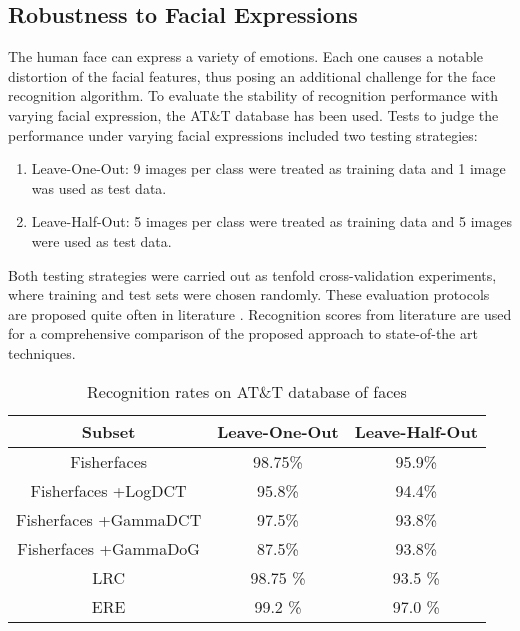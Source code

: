 \subsection{Robustness to Facial Expressions}
The human face can express a variety of emotions. %
Each one causes a notable distortion of the facial features, thus posing an additional
 challenge for the face recognition algorithm.
 To evaluate the stability of recognition performance with varying facial expression, the AT\&T database has been used.
 Tests to judge the performance under varying facial expressions included two testing strategies:
 \begin{enumerate}
   \item Leave-One-Out: 9 images per class were treated as training data and 1 image was used as test data.
   \item Leave-Half-Out: 5 images per class were treated as training data and 5 images were used as test data.
 \end{enumerate}
 Both testing strategies were carried out as tenfold cross-validation experiments, where training and test sets were chosen randomly.
 These evaluation protocols are proposed quite often in literature \cite{Naseem2010, Yang2002}.
 Recognition scores from literature are used for a comprehensive comparison of the proposed approach to state-of-the art techniques.
\begin{table}[htbp]
  \caption{Recognition rates on AT\&T database of faces}
	\label{table:att}
	\begin{center}
		\begin{tabular}{c|c|c}
		Subset & Leave-One-Out & Leave-Half-Out  \\
		\hline
		Fisherfaces& 98.75\% &95.9\% \\ 
		Fisherfaces +LogDCT& 95.8\% &94.4\% \\
		Fisherfaces +GammaDCT& 97.5\% &93.8\% \\
		Fisherfaces +GammaDoG& 87.5\% &93.8\% \\
		\hline
		LRC \cite{Naseem2010} & 98.75 \% & 93.5 \% \\
    ERE \cite{Wright2009} & 99.2 \% & 97.0 \% \\
		\end{tabular}
	\end{center}
\end{table}

